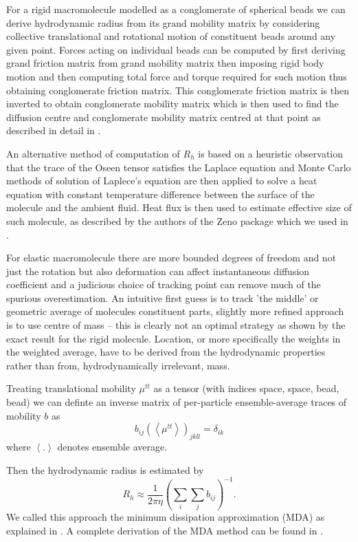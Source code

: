 \documentclass{doctoral}
\begin{document}
For a rigid macromolecule modelled as a conglomerate of spherical beads we can derive hydrodynamic radius from its grand mobility matrix by considering collective translational and rotational motion of constituent beads around any given point. Forces acting on individual beads can be computed by first deriving grand friction matrix from grand mobility matrix then imposing rigid body motion and then computing total force and torque required for such motion thus obtaining conglomerate friction matrix. This conglomerate friction matrix is then inverted to obtain conglomerate mobility matrix which is then used to find the diffusion centre and conglomerate mobility matrix centred at that point as described in detail in \cite{Cichocki_2019}.

An alternative method of computation of $R_h$ is based on a heuristic observation that the trace of the Oseen tensor satisfies the Laplace equation and Monte Carlo methods of solution of Laplece's equation are then applied to solve a heat equation with constant temperature difference between the surface of the molecule and the ambient fluid. Heat flux is then used to estimate effective size of such molecule, as described by the authors of the Zeno package \cite{Juba_2017} which we used in \textcite{Waszkiewicz_2023_dna}.

For elastic macromolecule there are more bounded degrees of freedom and not just the rotation but also deformation can affect instantaneous diffusion coefficient and a judicious choice of tracking point can remove much of the spurious overestimation. An intuitive first guess is to track 'the middle' or geometric average of molecules constituent parts, slightly more refined approach is to use centre of mass -- this is clearly not an optimal strategy as shown by the exact result for the rigid molecule. Location, or more specifically the weights in the weighted average, have to be derived from the hydrodynamic properties rather than from, hydrodynamically irrelevant, mass.

Treating translational mobility $\mu^{tt}$ as a tensor (with indices space, space, bead, bead) we can definte an inverse matrix of per-particle ensemble-average traces of mobility $b$ as
\begin{equation}
    b_{ij} (\left< \mu^{tt} \right> )_{jkll} = \delta_{ik}
\end{equation}
where $\left< . \right>$ denotes ensemble average.

Then the hydrodynamic radius is estimated by
\begin{equation}
    R_h \approx \frac{1}{2 \pi \eta} \left( \sum_i \sum_j b_{ij} \right)^{-1}.
\end{equation}
We called this approach the minimum dissipation approximation (MDA) as explained in \textcite{Waszkiewicz_2024_mda}. A complete derivation of the MDA method can be found in \textcite{Cichocki_2019}.
\end{document}
